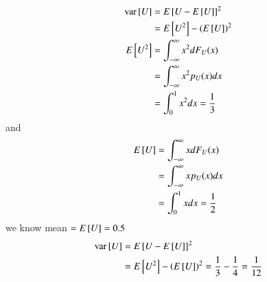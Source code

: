 \documentclass[journal,12pt,twocolumn]{IEEEtran}
\renewcommand\thesection{\arabic{section}}
\begin{document}
\begin{enumerate}[label=\thesection.\arabic*
,ref=\thesection.\theenumi]
\begin{align}
\text{var}{}\left[U\right] &= E{}\left[U - E{}\left[U\right]\right]^2 \\
	&= E{}\left[U^2\right] - \left(E{}\left[U\right]\right)^2\\
	E{}\left[U^2\right] &= \int_{-\infty}^{\infty}x^2dF_U(x) \\
	&= \int_{-\infty}^{\infty}x^2p_U(x)dx \\
	&= \int_{0}^{1}x^2dx = \frac{1}{3}
\end{align}
and
\begin{align}
	E{}\left[U\right] &= \int_{-\infty}^{\infty}xdF_U(x) \\
	&= \int_{-\infty}^{\infty}xp_U(x)dx \\
	&= \int_{0}^{1}xdx = \frac{1}{2}
\end{align}
we know  mean $= E{}\left[U\right]=0.5$ 
\begin{align}
	\text{var}{}\left[U\right] &= E{}\left[U - E{}\left[U\right]\right]^2 \\
	&= E{}\left[U^2\right] - \left(E{}\left[U\right]\right)^2 = \frac{1}{3} - \frac{1}{4} = \frac{1}{12} \\
\end{align}

\end{enumerate}
\end{document}
